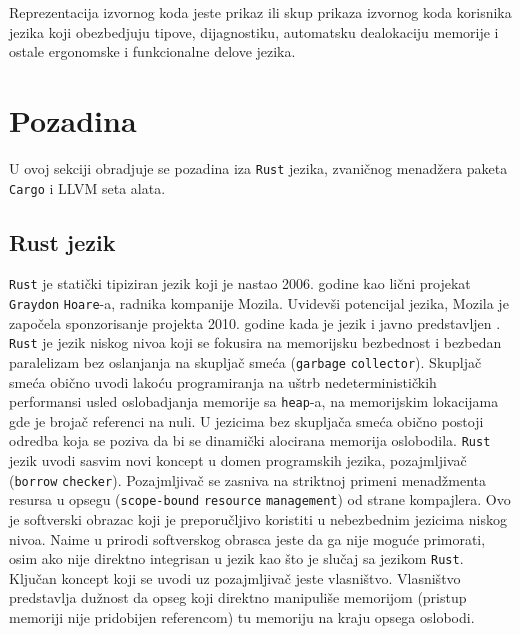 \documentclass[11pt]{article}
\begin{document}
Reprezentacija izvornog koda jeste prikaz ili skup prikaza izvornog koda korisnika jezika koji obezbedjuju tipove, dijagnostiku,
automatsku dealokaciju memorije i ostale ergonomske i funkcionalne delove jezika.
\newpage

\section{Pozadina}

U ovoj sekciji obradjuje se pozadina iza \verb|Rust| jezika, zvaničnog menadžera paketa \verb|Cargo| i 
LLVM seta alata.

\subsection{Rust jezik}

\verb|Rust| je statički tipiziran jezik koji je nastao 2006. godine kao lični projekat \verb|Graydon| \verb|Hoare|-a, radnika kompanije 
Mozila. Uvidevši potencijal jezika, Mozila je započela sponzorisanje projekta 2010. godine kada je jezik i javno 
predstavljen \cite{rust-language}. \verb|Rust| je jezik niskog nivoa koji se fokusira na memorijsku bezbednost
i bezbedan paralelizam bez oslanjanja na skupljač smeća (\verb|garbage| \verb|collector|). Skupljač smeća 
obično uvodi lakoću programiranja na uštrb nedeterminističkih performansi usled oslobadjanja memorije 
sa \verb|heap|-a, na memorijskim lokacijama gde je brojač referenci na nuli. U jezicima bez skupljača 
smeća obično postoji odredba koja se poziva da bi se dinamički alocirana memorija oslobodila. \verb|Rust|
jezik uvodi sasvim novi koncept u domen programskih jezika, pozajmljivač (\verb|borrow| \verb|checker|).
Pozajmljivač se zasniva na striktnoj primeni menadžmenta resursa u opsegu (\verb|scope-bound| \verb|resource| \verb|management|) 
od strane kompajlera. Ovo je softverski obrazac koji je preporučljivo koristiti u nebezbednim jezicima 
niskog nivoa. Naime u prirodi softverskog obrasca jeste da ga nije moguće primorati, osim ako nije direktno
integrisan u jezik kao što je slučaj sa jezikom \verb|Rust|. Ključan koncept koji se uvodi uz pozajmljivač 
jeste vlasništvo. Vlasništvo predstavlja dužnost da opseg koji direktno manipuliše memorijom (pristup memoriji nije 
pridobijen referencom) tu memoriju na kraju opsega oslobodi. 
\end{document}
